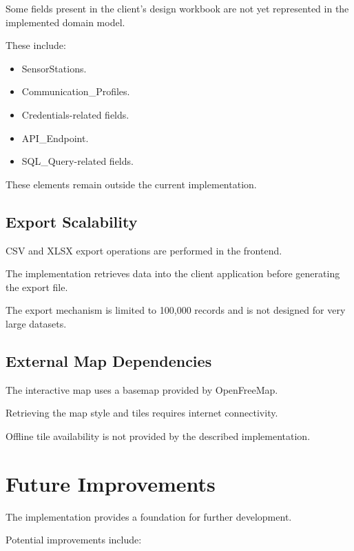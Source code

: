 \documentclass[11pt,a4paper]{article}
\begin{document}
Some fields present in the client's
design workbook are not yet represented
in the implemented domain model.

These include:

\begin{itemize}
    \item SensorStations.
    \item Communication\_Profiles.
    \item Credentials-related fields.
    \item API\_Endpoint.
    \item SQL\_Query-related fields.
\end{itemize}

These elements remain outside
the current implementation.

\subsection{Export Scalability}

CSV and XLSX export operations
are performed in the frontend.

The implementation retrieves
data into the client application
before generating the export file.

The export mechanism is limited
to 100,000 records and is not
designed for very large datasets.

\subsection{External Map Dependencies}

The interactive map uses a basemap
provided by OpenFreeMap.

Retrieving the map style and tiles requires
internet connectivity.

Offline tile availability is
not provided by the described
implementation.


\section{Future Improvements}

The implementation provides a foundation
for further development.

Potential improvements include:
\end{document}
